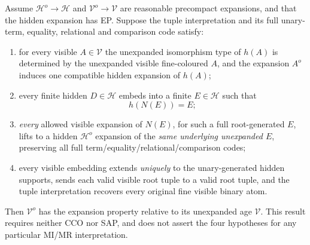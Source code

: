 \begin{theorem}
\label{thm:foundational-cofinal-tuple-EP}
Assume $\mathcal H^o\to\mathcal H$ and
$\mathcal V^o\to\mathcal V$ are reasonable precompact expansions,
and that the hidden expansion has EP. Suppose the tuple interpretation
and its full unary-term, equality, relational and comparison code satisfy:
\begin{enumerate}[label=(\roman*),leftmargin=*]
\item for every visible $A\in\mathcal V$ the unexpanded
isomorphism type of $h(A)$ is determined by the
unexpanded visible fine-coloured $A$, and the expansion
$A^o$ induces one compatible hidden expansion of $h(A)$;
\item every finite hidden $D\in\mathcal H$ embeds into
a finite $E\in\mathcal H$ such that
\[
                         h(N(E))=E;
\]
\item \emph{every} allowed visible expansion of
$N(E)$, for such a full root-generated $E$, lifts to
a hidden $\mathcal H^o$ expansion of the \emph{same
underlying unexpanded $E$}, preserving all full
term/equality/relational/comparison codes;
\item every visible embedding extends \emph{uniquely}
to the unary-generated hidden supports, sends each
valid visible root tuple to a valid root tuple,
and the tuple interpretation recovers every original
fine visible binary atom.
\end{enumerate}
Then $\mathcal V^o$ has the expansion property
relative to its unexpanded age $\mathcal V$.
This result requires neither CCO nor SAP, and
does not assert the four hypotheses for any
particular MI/MR interpretation.
\end{theorem}
